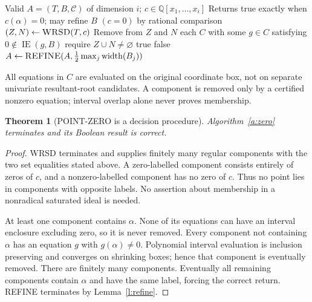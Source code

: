 \documentclass[11pt]{article}
\newtheorem{theorem}{Theorem}[section]
\theoremstyle{definition}
\newcommand{\QQ}{\mathbb Q}
\newcommand{\Eval}{\operatorname{IE}}
\newcommand{\width}{\operatorname{width}}
\newcommand{\alg}[1]{\textsc{#1}}
\begin{document}
\begin{algorithm}[H]
\caption{POINT-ZERO: exact zero at one selected branch}\label{a:zero}
\begin{algorithmic}[1]
\Require Valid $A=(T,B,\mathcal C)$ of dimension $i$;
$c\in\QQ[x_1,\ldots,x_i]$
\Ensure Returns true exactly when $c(\alpha)=0$; may refine $B$
 \State \Return $(c=0)$ by rational comparison \EndIf
\State $(Z,N)\gets\alg{WRSD}(T,c)$
\Loop
 \State Remove from $Z$ and $N$ each $C$ with some $g\in C$ satisfying $0\notin\Eval(g,B)$
 \State require $Z\cup N\ne\varnothing$
  \State \Return true \EndIf
  \State \Return false \EndIf
 \State $A\gets\alg{REFINE}(A,\frac12\max_j\width(B_j))$
\EndLoop
\end{algorithmic}
\end{algorithm}
All equations in $C$ are evaluated on the original coordinate box, not on separate
univariate resultant-root candidates. A component is removed only by a certified
nonzero equation; interval overlap alone never proves membership.

\begin{theorem}[POINT-ZERO is a decision procedure]\label{t:zero}
Algorithm~\ref{a:zero} terminates and its Boolean result is correct.
\end{theorem}
\begin{proof}
WRSD terminates and supplies finitely many regular components with the two
set equalities stated above. A zero-labelled component consists entirely of
zeros of $c$, and a nonzero-labelled component has no zero of $c$.
Thus no point lies in components with opposite labels. No assertion about
membership in a nonradical saturated ideal is needed.

At least one component contains $\alpha$. None of its equations can have an
interval enclosure excluding zero, so it is never removed. Every component not
containing $\alpha$ has an equation $g$ with $g(\alpha)\ne0$. Polynomial interval
evaluation is inclusion preserving and converges on shrinking boxes; hence that
component is eventually removed. There are finitely many components. Eventually
all remaining components contain $\alpha$ and have the same label, forcing the
correct return. REFINE terminates by Lemma~\ref{l:refine}.
\end{proof}
\end{document}

